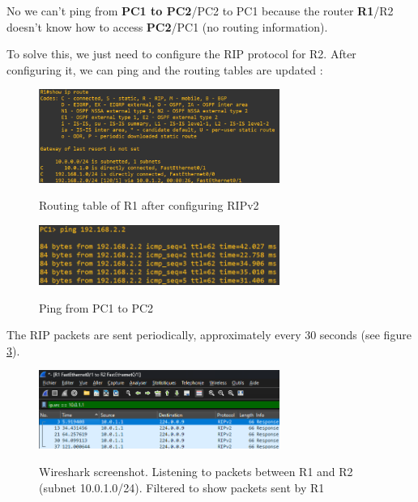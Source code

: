 \documentclass[10pt,a4paper]{ULBreport}
\begin{document}




No we can't ping from \textbf{PC1 to PC2}/PC2 to PC1 because the router \textbf{R1}/R2 doesn't know how to access \textbf{PC2}/PC1 (no routing information).



To solve this, we just need to configure the RIP protocol for R2. After configuring it, we can ping and the routing tables are updated :

\begin{figure}[H]
    \caption{Routing table of R1 after configuring RIPv2}
    \center
    \includegraphics[width=0.7\textwidth]{routeR1RIP.png}
    \label{routeR1rip}
\end{figure}

\begin{figure}[H]
    \caption{Ping from PC1 to PC2}
    \center
    \includegraphics[width=0.7\textwidth]{pingPC1PC2RIP.png}
    \label{pingPC1PC2rip}
\end{figure}







The RIP packets are sent periodically, approximately every 30 seconds (see figure \ref{ripfreq}).

\begin{figure}[H]
    \caption{Wireshark screenshot. Listening to packets between R1 and R2 (subnet 10.0.1.0/24). Filtered to show packets sent by R1}
    \center
    \includegraphics[width=0.7\textwidth]{RIPFreq.png}
    \label{ripfreq}
\end{figure}
\end{document}
